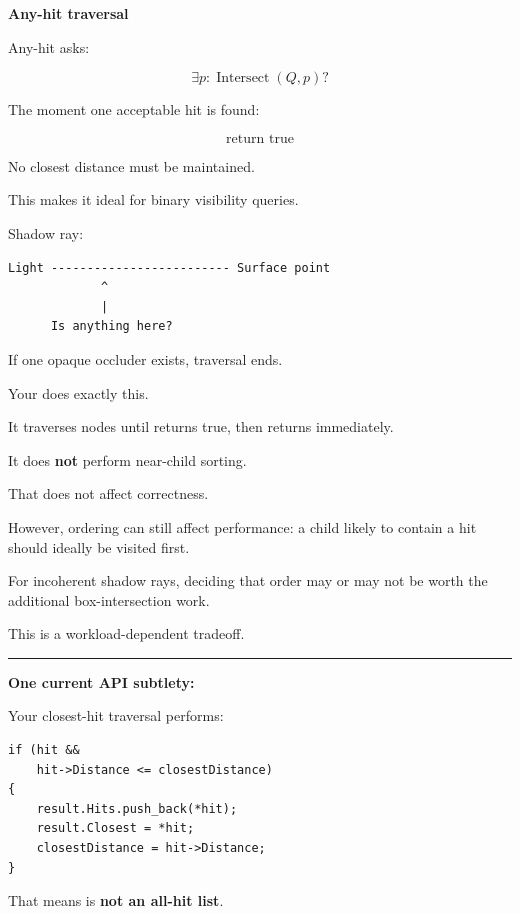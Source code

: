 \textbf{Any-hit traversal}

Any-hit asks:

\[
\exists p:
\operatorname{Intersect}(Q,p)?
\]

The moment one acceptable hit is found:

\[
\boxed{\text{return true}}
\]

No closest distance must be maintained.

This makes it ideal for binary visibility queries.

Shadow ray:

\begin{verbatim}
Light ------------------------- Surface point
             ^
             |
      Is anything here?
\end{verbatim}

If one opaque occluder exists, traversal ends.

Your  does exactly this.

It traverses nodes until  returns true, then returns immediately.

It does \textbf{not} perform near-child sorting.

That does not affect correctness.

However, ordering can still affect performance: a child likely to contain a hit should ideally be visited first.

For incoherent shadow rays, deciding that order may or may not be worth the additional box-intersection work.

This is a workload-dependent tradeoff.

\begin{center}\rule{0.5\linewidth}{0.5pt}\end{center}

\textbf{One current API subtlety: }

Your closest-hit traversal performs:

\begin{verbatim}
if (hit &&
    hit->Distance <= closestDistance)
{
    result.Hits.push_back(*hit);
    result.Closest = *hit;
    closestDistance = hit->Distance;
}
\end{verbatim}

That means  is \textbf{not an all-hit list}.

